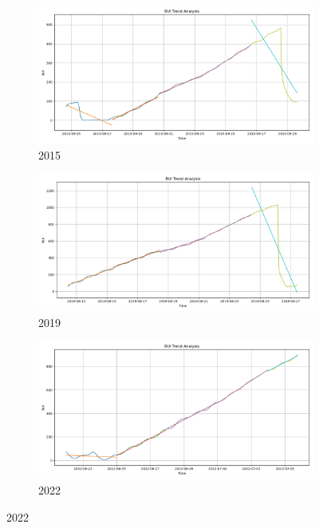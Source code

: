\begin{figure}[h]
	\centering
	\caption{15-days BUI polyfit trend}
	\begin{subfigure}{0.3\textwidth}
		\centering
		\includegraphics[width=\textwidth]{graphs/polyfit_trend_analysis/2015_15days_BLOCK3days_bui_trend_analysis.png}
		\caption{2015}
		\label{fig:2015_polyfit_bui}
	\end{subfigure}
	\hfill
	\begin{subfigure}{0.3\textwidth}
		\centering
		\includegraphics[width=\textwidth]{graphs/polyfit_trend_analysis/2019_15days_BLOCK3days_bui_trend_analysis.png}
		\caption{2019}
		\label{fig:2019_polyfit_bui}
	\end{subfigure}
	\hfill
	\begin{subfigure}{0.3\textwidth}
		\centering
		\includegraphics[width=\textwidth]{graphs/polyfit_trend_analysis/2022_15days_BLOCK3days_bui_trend_analysis.png}
		\caption{2022}
		\label{fig:2022_polyfit_bui}
	\end{subfigure}
	
	\label{fig:bui_polyfit_15}
\end{figure}



